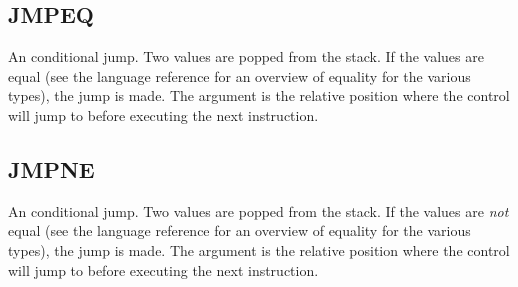 \subsection{JMPEQ}
\label{sec:jmpeq}
An conditional jump. Two values are popped from the stack. If the values
are equal (see the language reference for an overview of equality for
the various types), the jump is made. The argument is the relative
position where the control will jump to before executing the next
instruction.

\subsection{JMPNE}
\label{sec:jmpne}
An conditional jump. Two values are popped from the stack. If the values
are \emph{not} equal (see the language reference for an overview of
equality for the various types), the jump is made. The argument is the
relative position where the control will jump to before executing the
next instruction.


